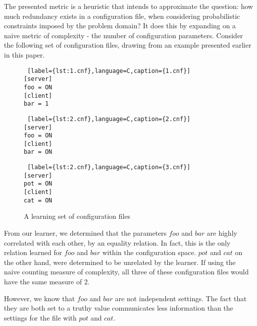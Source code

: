 
The presented metric is a heuristic that intends to approximate the question: 
how much redundancy exists in a configuration file, when considering
probabilistic constraints imposed by the problem domain? It does this by
expanding on a naive metric of complexity - the number of configuration 
parameters. Consider the following set of configuration files, drawing from
an example presented earlier in this paper.

\begin{figure}[!htb]
    \centering
    \begin{minipage}{.25\textwidth}
    \begin{lstlisting} [label={lst:1.cnf},language=C,caption={1.cnf}]
[server]
foo = ON
[client]
bar = 1
    \end{lstlisting}
    \end{minipage}%
    \hspace{1cm}
    \begin{minipage}{0.25\textwidth}
    \begin{lstlisting} [label={lst:2.cnf},language=C,caption={2.cnf}]
[server]
foo = ON
[client]
bar = ON
    \end{lstlisting}
    \end{minipage}
    \hspace{1cm}
    \begin{minipage}{0.25\textwidth}
    \begin{lstlisting} [label={lst:2.cnf},language=C,caption={3.cnf}]
[server]
pot = ON
[client]
cat = ON
    \end{lstlisting}
    \end{minipage}
    \caption{A learning set of configuration files}
    \label{fig:complexityset}
\end{figure}

From our learner, we determined that the parameters $foo$ and $bar$ are
highly correlated with each other, by an equality relation. In fact, this
is the only relation learned for $foo$ and $bar$ within the configuration
space. $pot$ and $cat$ on the other hand, were determined to be unrelated
by the learner. If using the naive counting measure of complexity, all 
three of these configuration files would have the same measure of $2$.

However, we know that $foo$ and $bar$ are not independent settings.
The fact that they are both set to a truthy value communicates less
information than the settings for the file with $pot$ and $cat$.

